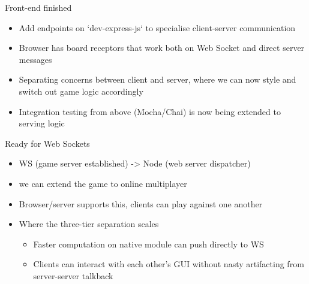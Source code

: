 \documentclass[allowframebreaks]{beamer}
\begin{document}
\begin{frame}[label={sec:org71c50b8}]{Front-end finished}
\begin{itemize}
\item Add endpoints on `dev-express-js` to specialise client-server communication
\item Browser has board receptors that work both on Web Socket and direct server messages
\item Separating concerns between client and server, where we can now style and switch out game logic
accordingly
\item Integration testing from above (Mocha/Chai) is now being extended to serving logic
\end{itemize}
\end{frame}
\begin{frame}[label={sec:orgba55666}]{Ready for Web Sockets}
\begin{itemize}
\item WS (game server established) -> Node (web server dispatcher)
\item we can extend the game to online multiplayer
\item Browser/server supports this, clients can play against one another
\item Where the three-tier separation scales
\begin{itemize}
\item Faster computation on native module can push directly to WS
\item Clients can interact with each other's GUI without nasty artifacting from server-server talkback
\end{itemize}
\end{itemize}
\end{frame}
\end{document}
